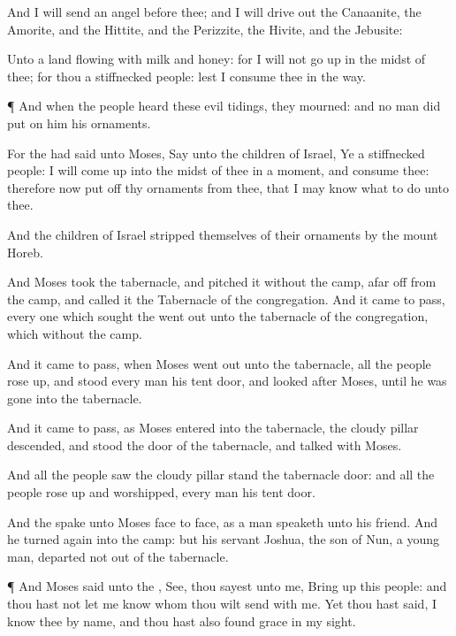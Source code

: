 {And I will
send an
angel
before thee; and I will drive
out the
Canaanite, the
Amorite, and the
Hittite, and the
Perizzite, the
Hivite, and the
Jebusite:

Unto a
land
flowing with
milk and
honey: for I will not go
up in the
midst of thee; for thou
{} a
stiffnecked
people: lest I
consume thee in the
way.


\par }{\PP {}¶ And when the
people
heard these
evil
tidings, they
mourned: and no
man did
put on him his
ornaments.

For the
{} had
said unto
Moses,
Say unto the
children of
Israel, Ye
{} a
stiffnecked
people: I will come
up into the
midst of thee in
a
moment, and
consume thee: therefore now put
off thy
ornaments from thee, that I may
know what to
do unto thee.

And the
children of
Israel
stripped themselves of their
ornaments by the
mount
Horeb.


\par }{\PP {}And
Moses
took the
tabernacle, and
pitched it
without the
camp, afar
off from the
camp, and
called it the
Tabernacle of the
congregation. And it came to pass,
{} every one which
sought the
{} went
out unto the
tabernacle of the
congregation, which
{}
without the
camp.

And it came to pass, when
Moses went
out unto the
tabernacle,
{} all the
people rose
up, and
stood every
man
{} his
tent
door, and
looked
after
Moses, until he was
gone into the
tabernacle.

And it came to pass, as
Moses
entered into the
tabernacle, the
cloudy
pillar
descended, and
stood
{} the
door of the
tabernacle, and
{}
talked with
Moses.

And all the
people
saw the
cloudy
pillar
stand
{} the
tabernacle
door: and all the
people rose
up and
worshipped, every
man
{} his
tent
door.

And the
{}
spake unto
Moses
face to
face, as a
man
speaketh unto his
friend. And he turned
again into the
camp: but his
servant
Joshua, the
son of
Nun, a young
man,
departed not
out of the
tabernacle.


\par }{\PP {}¶ And
Moses
said unto the
{},
See, thou
sayest unto me, Bring
up this
people: and thou hast not let me
know whom thou wilt
send with me. Yet thou hast
said, I
know thee by
name, and thou hast also
found
grace in my
sight.

}
